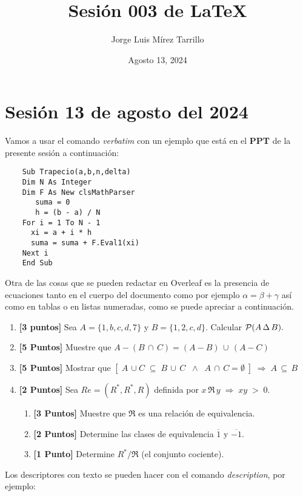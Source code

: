 \documentclass{article}
\title{Sesión 003 de LaTeX}
\author{Jorge Luis Mírez Tarrillo}
\date{Agosto 13, 2024}
\begin{document}
\maketitle

\section*{Sesión 13 de agosto del 2024}

Vamos a usar el comando \textit{verbatim} con un ejemplo que está en el \textbf{PPT} de la presente sesión a continuación:

\begin{verbatim}
    Sub Trapecio(a,b,n,delta)
    Dim N As Integer
    Dim F As New clsMathParser
       suma = 0
       h = (b - a) / N
    For i = 1 To N - 1
      xi = a + i * h
      suma = suma + F.Eval1(xi)
    Next i
    End Sub
\end{verbatim}

Otra de las cosas que se pueden redactar en Overleaf es la presencia de ecuaciones tanto en el cuerpo del documento como por ejemplo $\alpha = \beta + \gamma$ así como en tablas o en listas numeradas, como se puede apreciar a continuación.

\begin{enumerate}
    \item {\textbf{[3 puntos]}} Sea $A = \{1,b,c,d,7\}$ y $B = \{1,2,c,d\}.$ Calcular ${\cal P}(A\, \Delta\, B).$
    \item {\textbf{[5 Puntos]}} Muestre que $A-(B\,\cap\,C)=(A-B)\,\cup\,(A - C)$
    \item {\textbf{[5 Puntos]}} Mostrar que $[\;A\,\cup C\;\subseteq\;B\,\cup\,C\;\;\wedge\;\; A\,\cap\,C=\emptyset\;]\; \Longrightarrow\;A\,\subseteq\,B$
    \item {\textbf{[2 Puntos]}} Sea $Re=(R^*, R^*,R)$ definida por $x\, \Re\, y\;\Longrightarrow\; xy\;>\;0.$
    \begin{enumerate}
        \item {\textbf{[3 Puntos]}} Muestre que $\Re$ es una relación de equivalencia.
        \item {\textbf{[2 Puntos]}} Determine las clases de equivalencia $\overline{1}$ y $\overline{-1}.$
        \item {\textbf{[1 Punto]}} Determine $R^*/\Re$ (el conjunto cociente).
    \end{enumerate}
\end{enumerate}

Los descriptores con texto se pueden hacer con el comando \textit{description}, por ejemplo:
\end{document}
